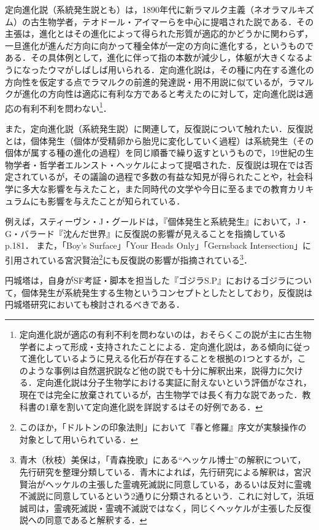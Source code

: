 \documentclass[10pt, a5paper, twoside]{ltjsarticle}
\begin{document}
            定向進化説（系統発生説とも）は，1890年代に新ラマルク主義（ネオラマルキズム）の古生物学者，テオドール・アイマーらを中心に提唱された説である．その主張は，進化とはその進化によって得られた形質が適応的かどうかに関わらず，一旦進化が進んだ方向に向かって種全体が一定の方向に進化する，というものである\cite{kawada,shikama}．その具体例として，進化に伴って指の本数が減少し，体躯が大きくなるようになったウマがしばしば用いられる．定向進化説は，その種に内在する進化の方向性を仮定する点でラマルクの前進的発達説・用不用説に似ているが，ラマルクが進化の方向性は適応に有利な方であると考えたのに対して，定向進化説は適応の有利不利を問わない\footnote{定向進化説が適応の有利不利を問わないのは，おそらくこの説が主に古生物学者によって形成・支持されたことによる．定向進化説は，ある傾向に従って進化しているように見える化石が存在することを根拠の1つとするが，このような事例は自然選択説など他の説でも十分に解釈出来，説得力に欠ける．定向進化説は分子生物学における実証に耐えないという評価がなされ，現在では完全に放棄されているが，古生物学では長く有力な説であった．教科書の1章を割いて定向進化説を詳説する\cite{shikama}はその好例である．}．

            また，定向進化説（系統発生説）に関連して，反復説について触れたい．反復説とは，個体発生（個体が受精卵から胎児に変化していく過程）は系統発生（その個体が属する種の進化の過程）を同じ順番で繰り返すというもので，19世紀の生物学者・哲学者エルンスト・ヘッケルによって提唱された．反復説は現在では否定されているが，その議論の過程で多数の有益な知見が得られたことや，社会科学に多大な影響を与えたこと，また同時代の文学や今日に至るまでの教育カリキュラムにも影響を与えたことが知られている．

            例えば，スティーヴン・J・グールドは，『個体発生と系統発生』において，J・G・バラード『沈んだ世界』に反復説の影響が見えることを指摘している\cite{ontogeny}p.181．%
            また，「Boy's Surface」「Your Heads Only」「Gernsback Intersection」に引用されている宮沢賢治\footnote{このほか，「ドルトンの印象法則」において『春と修羅』序文が実験操作の対象として用いられている．}にも反復説の影響が指摘されている\footnote{青木（秋枝）美保は，「青森挽歌」にある“ヘッケル博士”の解釈について，先行研究を整理分類している．青木によれば，先行研究による解釈は，宮沢賢治がヘッケルの主張した霊魂死滅説に同意している，あるいは反対に霊魂不滅説に同意しているという2通りに分類されるという\cite{akieda}．これに対して，浜垣誠司は，霊魂死滅説・霊魂不滅説ではなく，同じくヘッケルが主張した反復説への同意であると解釈する\cite{hamagaki}．}．

            円城塔は，自身がSF考証・脚本を担当した『ゴジラS.P』におけるゴジラについて，個体発生が系統発生する生物というコンセプトとしたとしており，反復説は円城塔研究においても検討されるべきである．
\end{document}
